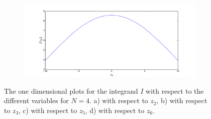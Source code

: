 \begin{figure}
\begin{subfigure}{.4\textwidth}
		\caption{}
	\end{subfigure}%
	\begin{subfigure}{.4\textwidth}
		\centering
			\includegraphics[width=1\linewidth]{./figures/basket_call_2d_time_stepping/integrand_plotting/N_4/1d_plots/smoothed_integrand_basket_2D_N_4_z6}
		\caption{}
		\end{subfigure}
	\caption{The one dimensional plots for the integrand $I$ with respect to the different variables for $N=4$. a) with respect to $z_2$, b) with respect to $z_3$, c) with respect to $z_5$,  d) with respect to $z_6$.}
	\label{fig:integrand_one_dim_N_4}
\end{figure}
\FloatBarrier



